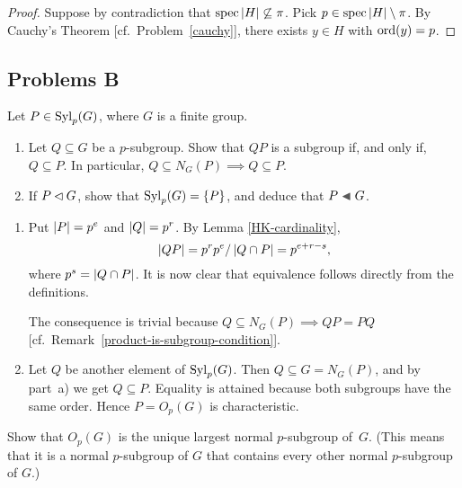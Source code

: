 \begin{proof} Suppose by contradiction that $\operatorname{spec}\left\vert{H}\right\vert\not\subseteq\pi$. Pick $p\in\operatorname{spec}\left\vert{H}\right\vert\setminus\pi$. By Cauchy's Theorem {\rm [cf.~Problem~\ref{cauchy}]}, there exists $y\in H$ with ${\rm ord}(y)=p$.  \end{proof}


\subsection{Problems B}
\begin{probl}\label{problem-1.B.1}
    Let $P \in{\rm Syl}_p(G)$, where $G$ is a finite group.
    \begin{enumerate}[\rm a)]
        \item Let $Q \subseteq G$ be a $p$-subgroup. Show that $QP$ is a subgroup if, and only if, $Q \subseteq P$. In particular, $Q\subseteq N_G(P)\implies Q\subseteq P$.
        \item If\/ $P\lhd G$, show that\/ ${\rm Syl}_p(G) = \{P\}$, and deduce that\/ $P\ch G$.
    \end{enumerate}
\end{probl}

\begin{solution}
\begin{enumerate}[\rm a)]
    \item Put $\left\vert{P}\right\vert=p^e$ and $\left\vert{Q}\right\vert=p^r$. By Lemma \ref{HK-cardinality},
    $$
        \left\vert{QP}\right\vert = p^rp^e/\left\vert{Q\cap P}\right\vert= p^{e+r-s},
    $$
    where $p^s=\left\vert{Q\cap P}\right\vert$. It is now clear that equivalence follows directly from the definitions.

    The consequence is trivial because $Q\subseteq N_G(P)\implies QP=PQ$ [cf.~Remark~\ref{product-is-subgroup-condition}].

    \item Let $Q$ be another element of\/ ${\rm Syl}_p(G)$. Then $Q\subseteq G=N_G(P)$, and by part~a) we get $Q\subseteq P$. Equality is attained because both subgroups have the same order. Hence $P=O_p(G)$ is characteristic.
\end{enumerate}
\end{solution}

\begin{probl}\label{problem-1.B.2}
    Show that $O_p(G)$ is the unique largest normal\/ $p$-subgroup of\/~$G$. (This means that it is a normal\/ $p$-subgroup of\/ $G$ that contains every other normal\/ $p$-subgroup of\/ $G$.)
\end{probl}

